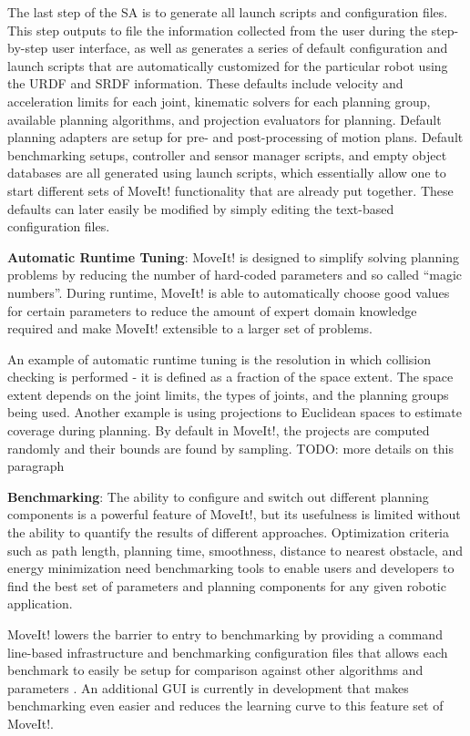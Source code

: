 \documentclass[10pt,journal,compsoc]{joser1}
\begin{document}
{The last step of the SA is to generate all launch scripts and configuration files. This step outputs to file the information collected from the user during the step-by-step user interface, as well as generates a series of default configuration and launch scripts that are automatically customized for the particular robot using the URDF and SRDF information. These defaults include velocity and acceleration limits for each joint, kinematic solvers for each planning group, available planning algorithms, and projection evaluators for planning. Default planning adapters are setup for pre- and post-processing of motion plans. Default benchmarking setups, controller and sensor manager scripts, and empty object databases are all generated using launch scripts, which essentially allow one to start different sets of MoveIt! functionality that are already put together. These defaults can later 
easily be modified by simply editing the text-based configuration files.

{\bf Automatic Runtime Tuning}: MoveIt! is designed to simplify solving planning problems by reducing the number of hard-coded parameters and so called ``magic numbers''. During runtime, MoveIt! is able to automatically choose good values for certain parameters to reduce the amount of expert domain knowledge required and make MoveIt! extensible to a larger set of problems. 

An example of automatic runtime tuning is the resolution in which collision checking is performed - it is defined as a fraction of the space extent. The space extent depends on the joint limits, the types of joints, and the planning groups being used. Another example is using projections to Euclidean spaces to estimate coverage during planning. By default in MoveIt!, the projects are computed randomly and their bounds are found by sampling. TODO: more details on this paragraph

{\bf Benchmarking}: The ability to configure and switch out different planning components is a powerful feature of MoveIt!, but its usefulness is limited without the ability to quantify the results of different approaches. Optimization criteria such as path length, planning time, smoothness, distance to nearest obstacle, and energy minimization need benchmarking tools to enable users and developers to find the best set of parameters and planning components for any given robotic application.

MoveIt! lowers the barrier to entry to benchmarking by providing a command line-based infrastructure and benchmarking configuration files that allows each benchmark to easily be setup for comparison against other algorithms and parameters \cite{cohen2012generic}. An additional GUI is currently in development that makes benchmarking even easier and reduces the learning curve to this feature set of MoveIt!.

}
\end{document}
